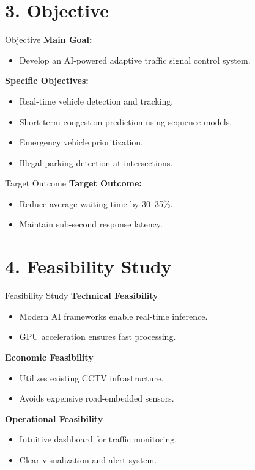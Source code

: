 \documentclass[aspectratio=169]{beamer}
\begin{document}
\section{3. Objective}

\begin{frame}{Objective}
\textbf{Main Goal:}
\begin{itemize}
    \item Develop an AI-powered adaptive traffic signal control system.
\end{itemize}

\textbf{Specific Objectives:}
\begin{itemize}
    \item Real-time vehicle detection and tracking.
    \item Short-term congestion prediction using sequence models.
    \item Emergency vehicle prioritization.
    \item Illegal parking detection at intersections.
\end{itemize}
\end{frame}

\begin{frame}{Target Outcome}
\textbf{Target Outcome:}
\begin{itemize}
    \item Reduce average waiting time by 30--35\%.
    \item Maintain sub-second response latency.
\end{itemize}
\end{frame}

\section{4. Feasibility Study}

\begin{frame}{Feasibility Study}
\textbf{Technical Feasibility}
\begin{itemize}
    \item Modern AI frameworks enable real-time inference.
    \item GPU acceleration ensures fast processing.
\end{itemize}

\textbf{Economic Feasibility}
\begin{itemize}
    \item Utilizes existing CCTV infrastructure.
    \item Avoids expensive road-embedded sensors.
\end{itemize}

\textbf{Operational Feasibility}
\begin{itemize}
    \item Intuitive dashboard for traffic monitoring.
    \item Clear visualization and alert system.
\end{itemize}
\end{frame}
\end{document}
